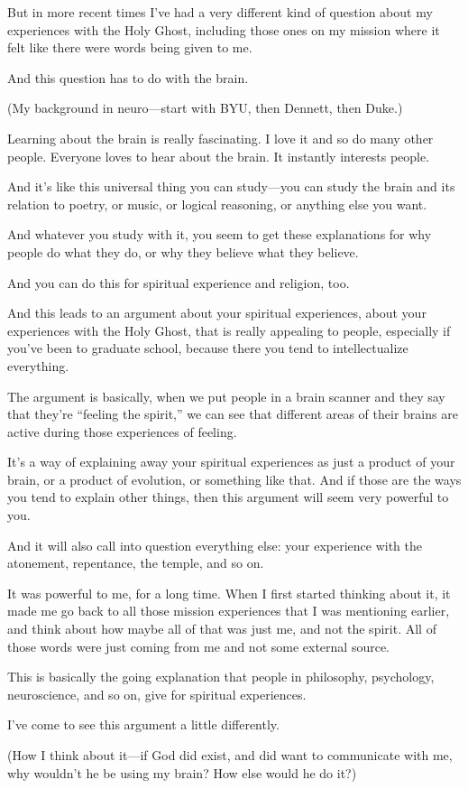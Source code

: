 \begin{compactitem}
			\item But in more recent times I've had a very different kind of question about my experiences with the Holy Ghost, including those ones on my mission where it felt like there were words being given to me.
				\begin{compactitem}
					\item And this question has to do with the brain.
					\item (My background in neuro---start with BYU, then Dennett, then Duke.)
					\item Learning about the brain is really fascinating. I love it and so do many other people. Everyone loves to hear about the brain. It instantly interests people.
					\item And it's like this universal thing you can study---you can study the brain and its relation to poetry, or music, or logical reasoning, or anything else you want. 
					\item And whatever you study with it, you seem to get these explanations for why people do what they do, or why they believe what they believe.
					\item And you can do this for spiritual experience and religion, too.
					\item And this leads to an argument about your spiritual experiences, about your experiences with the Holy Ghost, that is really appealing to people, especially if you've been to graduate school, because there you tend to intellectualize everything.
					\item The argument is basically, when we put people in a brain scanner and they say that they're ``feeling the spirit,'' we can see that different areas of their brains are active during those experiences of feeling.
					\item It's a way of explaining away your spiritual experiences as just a product of your brain, or a product of evolution, or something like that. And if those are the ways you tend to explain other things, then this argument will seem very powerful to you.
					\item And it will also call into question everything else: your experience with the atonement, repentance, the temple, and so on.
					\item It was powerful to me, for a long time. When I first started thinking about it, it made me go back to all those mission experiences that I was mentioning earlier, and think about how maybe all of that was just me, and not the spirit. All of those words were just coming from me and not some external source.
					\item This is basically the going explanation that people in philosophy, psychology, neuroscience, and so on, give for spiritual experiences.
					\item I've come to see this argument a little differently.
					\item (How I think about it---if God did exist, and did want to communicate with me, why wouldn't he be using my brain? How else would he do it?)
				\end{compactitem}
				

\end{compactitem}
